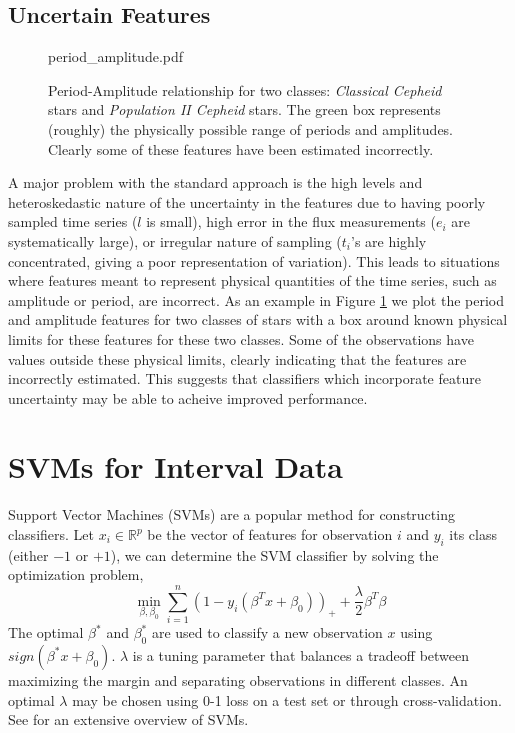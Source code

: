 \documentclass[10pt]{article}
\theoremstyle{definition}
\begin{document}
\subsection{Uncertain Features}
\begin{figure}[h]
  \begin{center}
    \begin{includegraphics}[scale=.5]{period_amplitude.pdf}
      \caption{Period-Amplitude relationship for two classes: \textit{Classical Cepheid} stars and \textit{Population II Cepheid} stars. The green box represents (roughly) the physically possible range of periods and amplitudes. Clearly some of these features have been estimated incorrectly.\label{fig:period_amplitude}}
    \end{includegraphics}
  \end{center}
\end{figure}
A major problem with the standard approach is the high levels and heteroskedastic nature of the uncertainty in the features due to having poorly sampled time series ($l$ is small), high error in the flux measurements ($e_{i}$ are systematically large), or irregular nature of sampling ($t_i$'s are highly concentrated, giving a poor representation of variation). This leads to situations where features meant to represent physical quantities of the time series, such as amplitude or period, are incorrect. As an example in Figure \ref{fig:period_amplitude} we plot the period and amplitude features for two classes of stars with a box around known physical limits for these features for these two classes. Some of the observations have values outside these physical limits, clearly indicating that the features are incorrectly estimated. This suggests that classifiers which incorporate feature uncertainty may be able to acheive improved performance.


\section{SVMs for Interval Data}
Support Vector Machines (SVMs) are a popular method for constructing classifiers. Let $x_i \in \mathbb{R}^p$ be the vector of features for observation $i$ and $y_i$ its class (either $-1$ or $+1$), we can determine the SVM classifier by solving the optimization problem,
\begin{equation}
\label{eq:svm}
\min_{\beta,\beta_0}  \sum_{i=1}^n (1 - y_i(\beta^Tx + \beta_0))_{+} + \frac{\lambda}{2}\beta^T\beta
\end{equation}
The optimal $\beta^*$ and $\beta_0^*$ are used to classify a new observation $x$ using $sign(\beta^* x + \beta_0)$. $\lambda$ is a tuning parameter that balances a tradeoff between maximizing the margin and separating observations in different classes. An optimal $\lambda$ may be chosen using 0-1 loss on a test set or through cross-validation. See \cite{scholkopf2002learning} for an extensive overview of SVMs.
\end{document}
